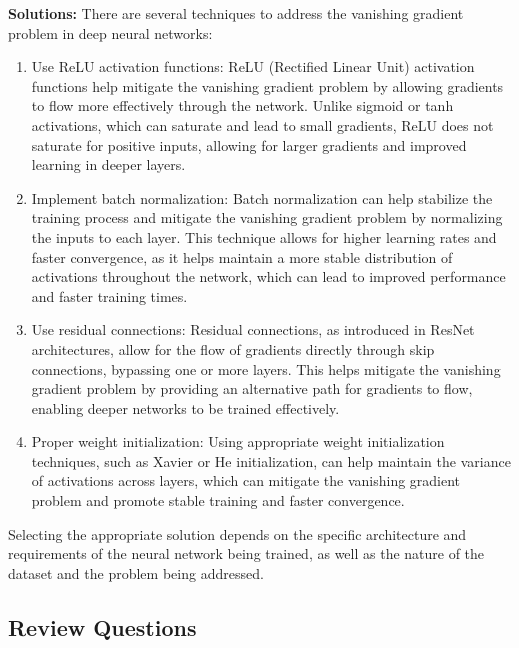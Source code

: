 \documentclass[
  letterpaper,
  DIV=11,
  numbers=noendperiod]{scrreprt}
\providecommand{\tightlist}{%
  \setlength{\itemsep}{0pt}\setlength{\parskip}{0pt}}
\begin{document}
\textbf{Solutions:} There are several techniques to address the
vanishing gradient problem in deep neural networks:

\begin{enumerate}
\def\labelenumi{\arabic{enumi}.}
\tightlist
\item
  Use ReLU activation functions: ReLU (Rectified Linear Unit) activation
  functions help mitigate the vanishing gradient problem by allowing
  gradients to flow more effectively through the network. Unlike sigmoid
  or tanh activations, which can saturate and lead to small gradients,
  ReLU does not saturate for positive inputs, allowing for larger
  gradients and improved learning in deeper layers.
\item
  Implement batch normalization: Batch normalization can help stabilize
  the training process and mitigate the vanishing gradient problem by
  normalizing the inputs to each layer. This technique allows for higher
  learning rates and faster convergence, as it helps maintain a more
  stable distribution of activations throughout the network, which can
  lead to improved performance and faster training times.
\item
  Use residual connections: Residual connections, as introduced in
  ResNet architectures, allow for the flow of gradients directly through
  skip connections, bypassing one or more layers. This helps mitigate
  the vanishing gradient problem by providing an alternative path for
  gradients to flow, enabling deeper networks to be trained effectively.
\item
  Proper weight initialization: Using appropriate weight initialization
  techniques, such as Xavier or He initialization, can help maintain the
  variance of activations across layers, which can mitigate the
  vanishing gradient problem and promote stable training and faster
  convergence.
\end{enumerate}

Selecting the appropriate solution depends on the specific architecture
and requirements of the neural network being trained, as well as the
nature of the dataset and the problem being addressed.

\subsection{Review Questions}\label{review-questions-18}
\end{document}
